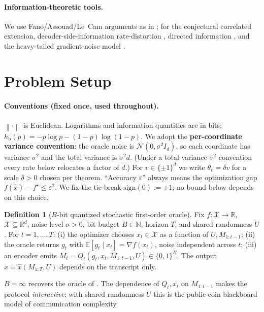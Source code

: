 \documentclass[11pt]{article}
\theoremstyle{definition}
\newtheorem{definition}{Definition}
\newcommand{\R}{\mathbb{R}}
\newcommand{\E}{\mathbb{E}}
\newcommand{\sign}{\mathrm{sign}}
\newcommand{\hb}{h_{\mathrm{b}}}
\newcommand{\eps}{\varepsilon}
\newcommand{\norm}[1]{\left\lVert #1 \right\rVert}
\newcommand{\Ncal}{\mathcal{N}}
\newcommand{\Xcal}{\mathcal{X}}
\begin{document}
\paragraph{Information-theoretic tools.} We use Fano/Assouad/Le~Cam arguments as in
\citep{cover2006elements,wainwright2019high,tsybakov2009introduction,yu1997assouad,polyanskiy2025information};
for the conjectural correlated extension, decoder-side-information rate-distortion
\citep{wyner1976sideinfo}, directed information \citep{massey1990directed,tatikonda2009capacity}, and
the heavy-tailed gradient-noise model \citep{simsekli2019tail}.

\section{Problem Setup}
\label{sec:setup}

\paragraph{Conventions (fixed once, used throughout).} $\norm{\cdot}$ is Euclidean. Logarithms and
information quantities are in bits; $\hb(p)=-p\log p-(1-p)\log(1-p)$. We adopt the \textbf{per-coordinate
variance convention}: the oracle noise is $\Ncal(0,\sigma^2 I_d)$, so each coordinate has variance
$\sigma^2$ and the total variance is $\sigma^2 d$. (Under a total-variance-$\sigma^2$ convention every
rate below relocates a factor of $d$.) For $v\in\{\pm1\}^d$ we write $\theta_v=\delta v$ for a scale
$\delta>0$ chosen per theorem. ``Accuracy $\eps$'' always means the optimization gap
$f(\hat x)-f^\star\le\eps^2$. We fix the tie-break $\sign(0):=+1$; no bound below depends on this choice.

\begin{definition}[$B$-bit quantized stochastic first-order oracle]
\label{def:oracle}
Fix $f:\Xcal\to\R$, $\Xcal\subseteq\R^d$, noise level $\sigma>0$, bit budget $B\in\mathbb{N}$, horizon
$T$, and shared randomness $U$. For $t=1,\dots,T$: (i) the optimizer chooses $x_t\in\Xcal$ as a
function of $U,M_{1:t-1}$; (ii) the oracle returns $g_t$ with $\E[g_t\mid x_t]=\nabla f(x_t)$, noise
independent across $t$; (iii) an encoder emits $M_t=Q_t(g_t,x_t,M_{1:t-1},U)\in\{0,1\}^{B}$. The output
$\hat x=\hat x(M_{1:T},U)$ depends on the transcript only.
\end{definition}

$B=\infty$ recovers the oracle of \citet{agarwal2012lower}. The dependence of $Q_t,x_t$ on $M_{1:t-1}$
makes the protocol \emph{interactive}; with shared randomness $U$ this is the public-coin blackboard
model of communication complexity.
\end{document}
